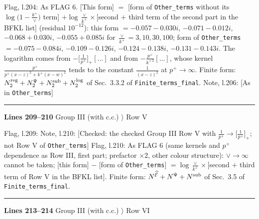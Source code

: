 \documentclass[10pt]{article}
\newenvironment{notebox}{\def\FrameCommand{{\color{notebar}\vrule width 1.5pt}\hspace{6pt}}\MakeFramed{\advance\hsize-\width\FrameRestore}\small}{\endMakeFramed}
\begin{document}
\begin{notebox}\textsf{\small Flag, l.204:}  As FLAG 6. [This form] $=$ [form of \texttt{Other\_terms} without its $\log\big(1-\frac{k^{+}}{\vee}\big)$ term] $+\log\frac{\vee}{k^{+}}\times$[second $+$ third term of the second part in the BFKL list] (residual $10^{-12}$): this form $=-0.057-0.030i$, $-0.071-0.012i$, $-0.068+0.030i$, $-0.055+0.085i$ for $\frac{\vee}{k^{+}}=3,10,30,100$; form of \texttt{Other\_terms} $=-0.075-0.084i$, $-0.109-0.126i$, $-0.124-0.138i$, $-0.131-0.143i$. The logarithm comes from $-\big[\frac{1}{p^{+}}\big]_{+}[\dots]$ and from $-\frac{p^{+}}{k^{+\,2}}[\dots]$, whose kernel $\frac{p^{+}}{p^{+}(x-z)^{2}+k^{+}(x-w)^{2}}$ tends to the constant $\frac{1}{(x-z)^{2}}$ at $p^{+}\to\infty$. Finite form: $N_{2}^{\rm reg}+N_{2}^{\Psi}+N_{2}^{\rm sub}+N_{2}^{\log}$ of Sec.~3.3.2 of \texttt{Finite\_terms\_final}.\end{notebox}
\begin{notebox}\textsf{\small Note, l.206:} [As in \texttt{Other\_terms}]\end{notebox}
\noindent\rule{\linewidth}{0.3pt}\par\noindent\textbf{Lines 209--210} \quad \textsf{Group III (with c.c.) $\rangle$ Row V} \par
\begin{notebox}\textsf{\small Flag, l.209:} \end{notebox}
\begin{notebox}\textsf{\small Note, l.210:} [Checked: the checked Group III Row V with $\frac{1}{p^{+}}\to\big[\frac{1}{p^{+}}\big]_{+}$; not Row V of \texttt{Other\_terms}]\end{notebox}
\begin{notebox}\textsf{\small Flag, l.210:}  As FLAG 6 (same kernels and $p^{+}$ dependence as Row III, first part; prefactor $\times2$, other colour structure): $\vee\to\infty$ cannot be taken; [this form] $-$ [form of \texttt{Other\_terms}] $=\log\frac{\vee}{k^{+}}\times$[second $+$ third term of Row V in the BFKL list]. Finite form: $N^{\widehat{\mathcal{E}}}+N^{\Psi}+N^{\rm sub}$ of Sec.~3.5 of \texttt{Finite\_terms\_final}.\end{notebox}
\noindent\rule{\linewidth}{0.3pt}\par\noindent\textbf{Lines 213--214} \quad \textsf{Group III (with c.c.) $\rangle$ Row VI} \par
\end{document}
